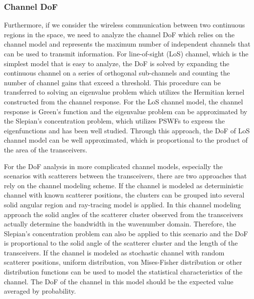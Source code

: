 \documentclass[journal,twocolumn]{IEEEtran}
\begin{document}
\subsubsection{Channel DoF}
Furthermore, if we consider the wireless communication between two continuous regions in the space, we need to analyze the channel DoF which relies on the channel model and represents the maximum number of independent channels that can be used to transmit information. For line-of-sight (LoS) channel, which is the simplest model that is easy to analyze, the DoF is solved by expanding the continuous channel on a series of orthogonal sub-channels and counting the number of channel gains that exceed a threshold. This procedure can be transferred to solving an eigenvalue problem which utilizes the Hermitian kernel constructed from the channel response. For the LoS channel model, the channel response is Green's function and the eigenvalue problem can be approximated by the Slepian's concentration problem, which utilizes PSWFs to express the eigenfunctions and has been well studied. Through this approach, the DoF of LoS channel model can be well approximated, which is proportional to the product of the area of the transceivers. 

For the DoF analysis in more complicated channel models, especially the scenarios with scatterers between the transceivers, there are two approaches that rely on the channel modeling scheme. 
If the channel is modeled as deterministic channel with known scatterer positions, the clusters can be grouped into several solid angular region and ray-tracing model is applied. 
In this channel modeling approach the solid angles of the scatterer cluster observed from the transceivers actually determine the bandwidth in the wavenumber domain. 
Therefore, the Slepian's concentration problem can also be applied to this scenario and the DoF is proportional to the solid angle of the scatterer cluster and the length of the transceivers. 
If the channel is modeled as stochastic channel with random scatterer positions, uniform distribution, von Mises-Fisher  distribution or other distribution functions can be used to model the statistical characteristics of the channel. 
The DoF of the channel in this model should be the expected value averaged by probability.

\end{document}
